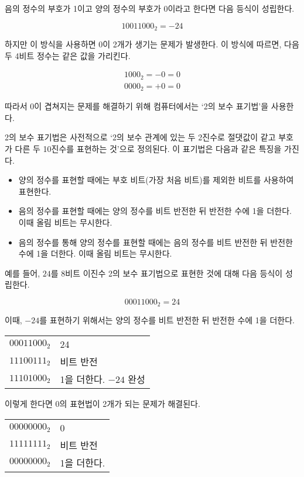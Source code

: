 \documentclass{article}
\begin{document}
음의 정수의 부호가 1이고 양의 정수의 부호가 0이라고 한다면 다음 등식이 성립한다.

$$
10011000_2 = -24
$$

하지만 이 방식을 사용하면 0이 2개가 생기는 문제가 발생한다. 이 방식에 따르면,
다음 두 4비트 정수는 같은 값을 가리킨다.

$$
\begin{aligned}
    1000_2 = -0 = 0 \\
    0000_2 = +0 = 0
\end{aligned}
$$

따라서 0이 겹쳐지는 문제를 해결하기 위해 컴퓨터에서는 `2의 보수 표기법'을 사용한다.

2의 보수 표기법은 사전적으로 `2의 보수 관계에 있는 두 2진수로 절댓값이 같고 부호가
다른 두 10진수를 표현하는 것'으로 정의된다. 이 표기법은 다음과 같은 특징을 가진다.

\begin{itemize}
    \item 양의 정수를 표현할 때에는 부호 비트(가장 처음 비트)를 제외한 비트를 사용하여 표현한다.
    \item 음의 정수를 표현할 때에는 양의 정수를 비트 반전한 뒤 반전한 수에 1을 더한다. 이때 올림 비트는 무시한다.
    \item 음의 정수를 통해 양의 정수를 표현할 때에는 음의 정수를 비트 반전한 뒤 반전한 수에 1을 더한다. 이때 올림 비트는 무시한다.
\end{itemize}

예를 들어, $24$를 8비트 이진수 2의 보수 표기법으로 표현한 것에 대해 다음 등식이 성립한다.

$$
00011000_2 = 24
$$

이때, $-24$를 표현하기 위해서는 양의 정수를 비트 반전한 뒤 반전한 수에 1을 더한다.

\begin{center}
    \begin{tabular}{rl}
        $00011000_2$ & 24 \\
        $11100111_2$ & 비트 반전 \\
        $11101000_2$ & 1을 더한다. $-24$ 완성
    \end{tabular}
\end{center}

이렇게 한다면 0의 표현법이 2개가 되는 문제가 해결된다.

\begin{center}
    \begin{tabular}{rl}
        $00000000_2$ & 0 \\
        $11111111_2$ & 비트 반전 \\
        $00000000_2$ & 1을 더한다.
    \end{tabular}
\end{center}
\end{document}
